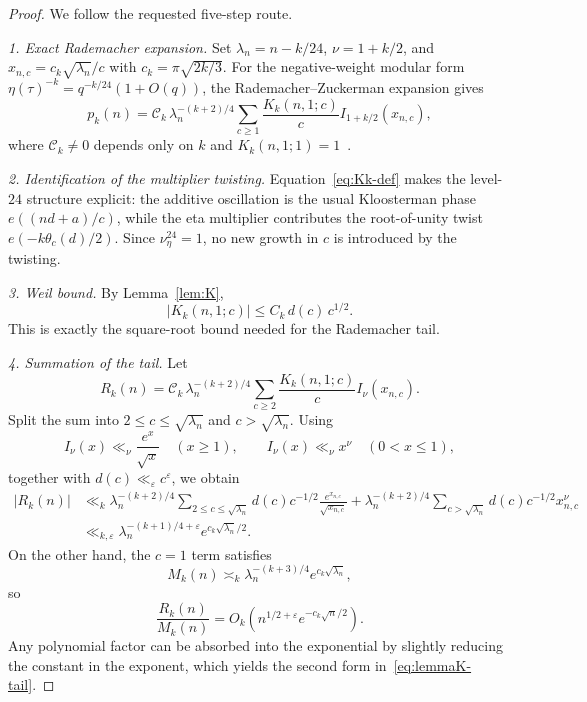 \documentclass[11pt,a4paper]{article}
\begin{document}
\begin{proof}
We follow the requested five-step route.

\smallskip
\noindent\emph{1. Exact Rademacher expansion.}
Set $\lambda_n=n-k/24$, $\nu=1+k/2$, and $x_{n,c}=c_k\sqrt{\lambda_n}/c$ with $c_k=\pi\sqrt{2k/3}$. For the negative-weight modular form $\eta(\tau)^{-k}=q^{-k/24}(1+O(q))$, the Rademacher--Zuckerman expansion gives
\begin{equation}\label{eq:rademacher-eta-k}
  p_k(n)=\mathcal C_k\,\lambda_n^{-(k+2)/4}
  \sum_{c\ge1}\frac{K_k(n,1;c)}{c}
  I_{1+k/2}(x_{n,c}),
\end{equation}
where $\mathcal C_k\neq0$ depends only on $k$ and $K_k(n,1;1)=1$~\cite{rademacher1937,apostol1990}.

\smallskip
\noindent\emph{2. Identification of the multiplier twisting.}
Equation~\eqref{eq:Kk-def} makes the level-$24$ structure explicit: the additive oscillation is the usual Kloosterman phase $e((nd+a)/c)$, while the eta multiplier contributes the root-of-unity twist $e(-k\theta_c(d)/2)$. Since $\nu_{\eta}^{24}=1$, no new growth in $c$ is introduced by the twisting.

\smallskip
\noindent\emph{3. Weil bound.}
By Lemma~\ref{lem:K},
\[
  |K_k(n,1;c)| \le C_k\,d(c)\,c^{1/2}.
\]
This is exactly the square-root bound needed for the Rademacher tail.

\smallskip
\noindent\emph{4. Summation of the tail.}
Let
\[
  R_k(n)=\mathcal C_k\,\lambda_n^{-(k+2)/4}
  \sum_{c\ge2}\frac{K_k(n,1;c)}{c}I_{\nu}(x_{n,c}).
\]
Split the sum into $2\le c\le \sqrt{\lambda_n}$ and $c>\sqrt{\lambda_n}$. Using
\[
  I_{\nu}(x)\ll_{\nu} \frac{e^x}{\sqrt{x}} \quad (x\ge1),
  \qquad
  I_{\nu}(x)\ll_{\nu} x^{\nu} \quad (0<x\le1),
\]
together with $d(c)\ll_{\varepsilon} c^{\varepsilon}$, we obtain
\[
\begin{aligned}
  |R_k(n)|
  &\ll_k \lambda_n^{-(k+2)/4}
    \sum_{2\le c\le \sqrt{\lambda_n}} d(c)c^{-1/2}\frac{e^{x_{n,c}}}{\sqrt{x_{n,c}}}
   + \lambda_n^{-(k+2)/4}
    \sum_{c>\sqrt{\lambda_n}} d(c)c^{-1/2}x_{n,c}^{\nu} \\
  &\ll_{k,\varepsilon} \lambda_n^{-(k+1)/4+\varepsilon}e^{c_k\sqrt{\lambda_n}/2}.
\end{aligned}
\]
On the other hand, the $c=1$ term satisfies
\[
  M_k(n)\asymp_k \lambda_n^{-(k+3)/4}e^{c_k\sqrt{\lambda_n}},
\]
so
\[
  \frac{R_k(n)}{M_k(n)}
  = O_k\!\left(n^{1/2+\varepsilon}e^{-c_k\sqrt n/2}\right).
\]
Any polynomial factor can be absorbed into the exponential by slightly reducing the constant in the exponent, which yields the second form in~\eqref{eq:lemmaK-tail}.


\end{proof}
\end{document}
